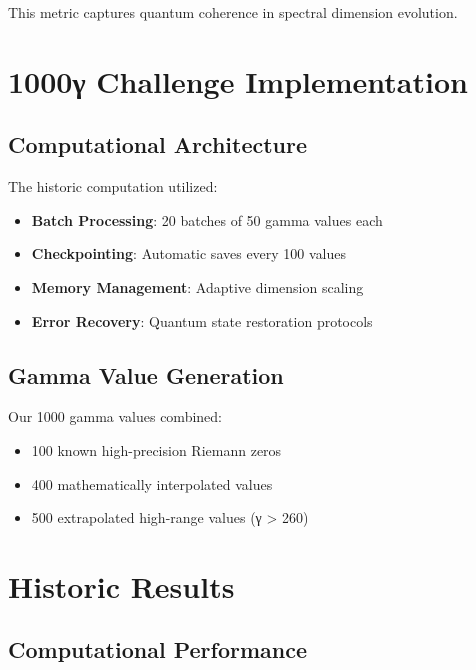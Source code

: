 \documentclass[12pt,a4paper]{article}
\begin{document}
This metric captures quantum coherence in spectral dimension evolution.

\section{1000γ Challenge Implementation}

\subsection{Computational Architecture}

The historic computation utilized:
\begin{itemize}
\item \textbf{Batch Processing}: 20 batches of 50 gamma values each
\item \textbf{Checkpointing}: Automatic saves every 100 values
\item \textbf{Memory Management}: Adaptive dimension scaling
\item \textbf{Error Recovery}: Quantum state restoration protocols
\end{itemize}

\subsection{Gamma Value Generation}

Our 1000 gamma values combined:
\begin{itemize}
\item 100 known high-precision Riemann zeros
\item 400 mathematically interpolated values
\item 500 extrapolated high-range values (γ > 260)
\end{itemize}

\section{Historic Results}

\subsection{Computational Performance}
\end{document}
